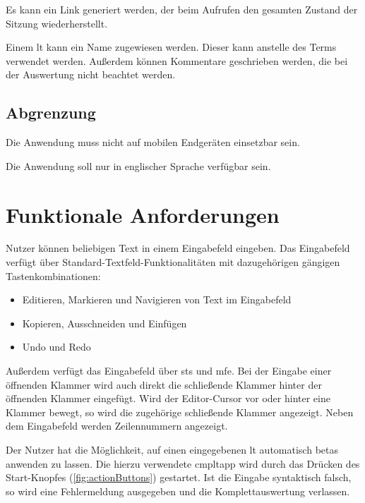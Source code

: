 \documentclass[parskip=full,11pt,twoside]{scrartcl}
\begin{document}
Es kann ein Link generiert werden, der beim Aufrufen den gesamten Zustand
der Sitzung wiederherstellt.

Einem \gls{lt} kann ein Name zugewiesen werden. Dieser kann anstelle des Terms
verwendet werden. Außerdem können Kommentare geschrieben werden, die bei der
Auswertung nicht beachtet werden.


\subsection{Abgrenzung}

Die Anwendung muss nicht auf mobilen Endgeräten einsetzbar sein.

Die Anwendung soll nur in englischer Sprache verfügbar sein.

\pagebreak

\section{Funktionale Anforderungen}

Nutzer können beliebigen Text in einem Eingabefeld eingeben. 
Das Eingabefeld verfügt über Standard-Textfeld-Funktionalitäten mit dazugehörigen gängigen Tastenkombinationen:
\begin{itemize}
	\item Editieren, Markieren und Navigieren von Text im Eingabefeld
	\item Kopieren, Ausschneiden und Einfügen
	\item Undo und Redo
\end{itemize}
Außerdem verfügt das Eingabefeld über \gls{st}s und \gls{mfe}.
Bei der Eingabe einer öffnenden Klammer wird auch direkt die schließende Klammer hinter der öffnenden Klammer eingefügt.
Wird der Editor-Cursor vor oder hinter eine Klammer bewegt, so wird die zugehörige schließende Klammer angezeigt.
Neben dem Eingabefeld werden Zeilennummern angezeigt.

Der Nutzer hat die Möglichkeit, auf einen eingegebenen \gls{lt} automatisch \glspl{beta} anwenden zu lassen. 
Die hierzu verwendete \gls{cmpltapp} wird durch das Drücken des Start-Knopfes (\cref{fig:actionButtons}) gestartet.
Ist die Eingabe syntaktisch falsch, so wird eine Fehlermeldung ausgegeben und die Komplettauswertung verlassen.
\end{document}
